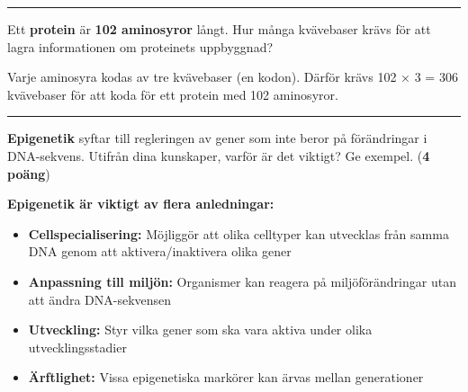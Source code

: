 \documentclass{exam}
\begin{document}
\begin{questions}
\vspace{5mm}
\hrule
\vspace{5mm}

\question Ett \textbf{protein} är \textbf{102 aminosyror} långt. Hur många kvävebaser krävs för att lagra informationen om proteinets uppbyggnad?
\begin{checkboxes}
\end{checkboxes}
\begin{solution}
Varje aminosyra kodas av tre kvävebaser (en kodon). Därför krävs 102 × 3 = 306 kvävebaser för att koda för ett protein med 102 aminosyror.
\end{solution}

\vspace{5mm}
\hrule
\vspace{5mm}

\newpage

\begin{center}
\end{center}
\vspace{5mm}

\question \textbf{Epigenetik} syftar till regleringen av gener som inte beror på förändringar i DNA-sekvens. Utifrån dina kunskaper, varför är det viktigt? Ge exempel. (\textbf{4 poäng})
\begin{solution}
\textbf{Epigenetik är viktigt av flera anledningar:}
\begin{itemize}
    \item \textbf{Cellspecialisering:} Möjliggör att olika celltyper kan utvecklas från samma DNA genom att aktivera/inaktivera olika gener
    \item \textbf{Anpassning till miljön:} Organismer kan reagera på miljöförändringar utan att ändra DNA-sekvensen
    \item \textbf{Utveckling:} Styr vilka gener som ska vara aktiva under olika utvecklingsstadier
    \item \textbf{Ärftlighet:} Vissa epigenetiska markörer kan ärvas mellan generationer
\end{itemize}

\end{solution}

\newpage


\end{questions}
\end{document}
